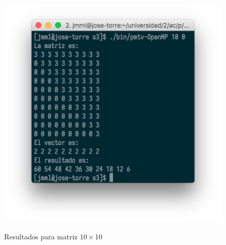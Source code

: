 \documentclass[11pt]{article}
\theoremstyle{definition-style}
\begin{document}
%    
%
%    
%
%    
%
%
%    
%
%
%



\begin{figure}[H]
    \centering
        \caption{Resultados para matriz $10 \times 10$}
    \includegraphics[width=0.6\linewidth]{./img/71.png}
    \label{fig:}
\end{figure}
\end{document}
